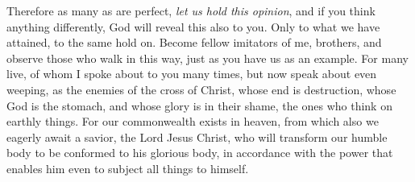 \begin{biblechapter}
 Therefore as many as are perfect, \textit{let us hold this opinion}, and if you think anything differently, God will reveal this also to you.
\verse Only to what we have attained, to the same hold on.
\verse Become fellow imitators of me, brothers, and observe those who walk in this way, just as you have us as an example.
\verse For many live, of whom I spoke about to you many times, but now speak about even weeping, as the enemies of the cross of Christ,
\verse whose end is destruction, whose God is the stomach, and whose glory is in their shame, the ones who think on earthly things.
\verse For our commonwealth exists in heaven, from which also we eagerly await a savior, the Lord Jesus Christ,
\verse who will transform our humble body to be conformed to his glorious body, in accordance with the power that enables him even to subject all things to himself.
\end{biblechapter}

